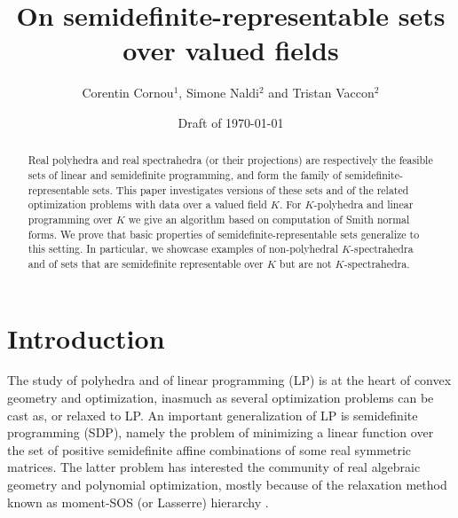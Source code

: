 \documentclass[a4paper,oneside,10pt]{article}
\title{\Large \bf On semidefinite-representable sets over valued fields}
\begin{document}
\author{Corentin Cornou$^{1}$, Simone Naldi$^{2}$ and Tristan Vaccon$^{2}$}


\date{Draft of \today}

\maketitle

\begin{abstract}
  \noindent
  Real polyhedra and real spectrahedra (or their projections) are respectively the feasible sets
  of linear and semidefinite programming, and form the family of
  semidefinite-representable sets. This paper investigates versions of these sets and of
  the related optimization problems with data over a valued field $K$.
  For $K$-polyhedra and linear programming over $K$ we give an algorithm based on computation
  of Smith normal forms.
  We prove that basic properties of semidefinite-representable sets generalize to this setting.
  In particular, we showcase examples of non-polyhedral $K$-spectrahedra and of sets that are
  semidefinite representable over $K$ but are not $K$-spectrahedra.
\end{abstract}


\section{Introduction}

The study of polyhedra and of linear programming (LP) is at the heart of convex geometry and optimization, inasmuch as several optimization problems can be cast as, or relaxed to LP. An important generalization of LP is semidefinite programming (SDP), namely the problem of minimizing a linear function over the set of positive semidefinite affine combinations of some real symmetric matrices. The latter problem has interested the community of real algebraic geometry and polynomial optimization, mostly because of the relaxation method known as moment-SOS (or Lasserre) hierarchy \cite{henrion2020moment}.
\end{document}
